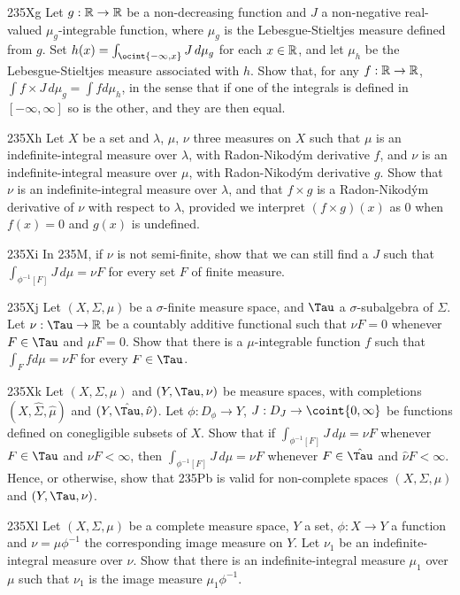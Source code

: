 {\spheader 235Xg Let $g:\Bbb R\to\Bbb R$ be a
non-decreasing function and $J$ a non-negative real-valued
$\mu_g$-integrable function, where $\mu_g$ is the Lebesgue-Stieltjes
measure defined from $g$.   Set
$h(x)=\int_{\ocint{-\infty,x}}J\,d\mu_g$ for each $x\in\Bbb R$, and let
$\mu_h$ be the Lebesgue-Stieltjes measure associated with $h$.   Show
that, for any $f:\Bbb R\to\Bbb R$,
$\int f\times J\,d\mu_g=\int fd\mu_h$, in the sense that if one of the
integrals is defined in $[-\infty,\infty]$ so is the other, and they are
then equal.

\sqheader 235Xh Let $X$ be a set and $\lambda$, $\mu$, $\nu$ three
measures on $X$ such that $\mu$ is an indefinite-integral measure over
$\lambda$, with Radon-Nikod\'ym derivative $f$, and $\nu$ is an
indefinite-integral measure over $\mu$, with Radon-Nikod\'ym derivative
$g$.   Show that $\nu$ is an indefinite-integral measure over $\lambda$,
and that $f\times g$ is a Radon-Nikod\'ym derivative of $\nu$ with
respect to $\lambda$, provided we interpret $(f\times g)(x)$ as $0$ when
$f(x)=0$ and $g(x)$ is undefined.

\spheader 235Xi In 235M, if $\nu$ is not semi-finite, show that
we can still find a $J$ such that $\int_{\phi^{-1}[F]}J\,d\mu=\nu F$ for
every set $F$ of finite measure.   

\spheader 235Xj Let $(X,\Sigma,\mu)$ be a $\sigma$-finite
measure space, and $\Tau$ a $\sigma$-subalgebra of $\Sigma$.   Let
$\nu:\Tau\to\Bbb R$ be a countably additive functional such that
$\nu F=0$ whenever $F\in\Tau$ and $\mu F=0$.   Show that there is a
$\mu$-integrable function $f$ such that $\int_Ffd\mu=\nu F$ for every
$F\in\Tau$.   

\spheader 235Xk Let $(X,\Sigma,\mu)$ and $(Y,\Tau,\nu)$ be
measure spaces, with completions $(X,\hat\Sigma,\hat\mu)$ and
$(Y,\hat\Tau,\hat\nu)$.   Let $\phi:D_{\phi}\to Y$,
$J:D_J\to \coint{0,\infty}$ be functions defined on conegligible subsets
of $X$. Show that if $\int_{\phi^{-1}[F]}J\,d\mu=\nu F$ whenever
$F\in\Tau$ and
$\nu F<\infty$, then $\int_{\phi^{-1}[F]}J\,d\mu=\nu F$ whenever
$F\in\hat\Tau$ and $\hat\nu F<\infty$.   Hence, or otherwise, show that
235Pb is valid for non-complete spaces $(X,\Sigma,\mu)$ and
$(Y,\Tau,\nu)$.

\spheader 235Xl Let $(X,\Sigma,\mu)$ be a complete measure space, 
$Y$ a set, $\phi:X\to Y$ a function and $\nu=\mu\phi^{-1}$ the 
corresponding image measure on $Y$.   Let $\nu_1$ be an
indefinite-integral measure over $\nu$.   Show that there is an
indefinite-integral measure $\mu_1$ over $\mu$ such that $\nu_1$ is the 
image measure $\mu_1\phi^{-1}$.

}
